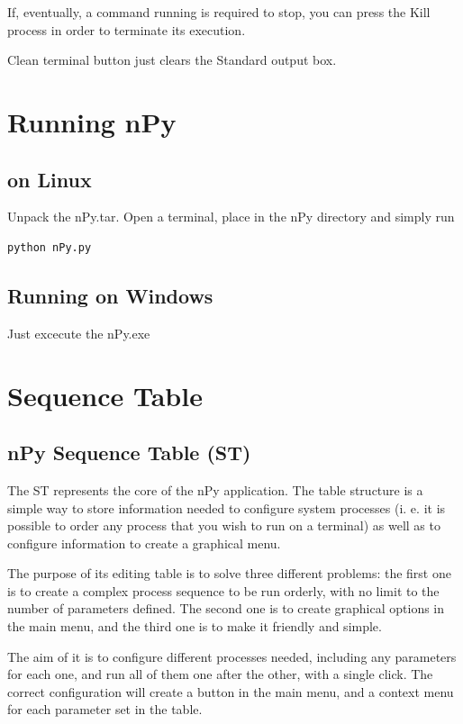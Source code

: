 \documentclass[a4paper,10pt]{article}
\begin{document}
If, eventually, a command running is required to stop, you can press the Kill process in order to terminate its execution.

Clean terminal button just clears the Standard output box.

\section{Running nPy}

\subsection{on Linux}

Unpack the nPy.tar. Open a terminal, place in the nPy directory and simply run
\begin{verbatim}
python nPy.py 
\end{verbatim}

\subsection{Running on Windows}

Just excecute the nPy.exe

\section{Sequence Table}

\subsection{nPy Sequence Table (ST)}

The ST represents the core of the nPy application. The table structure is a simple way to store information needed to configure system processes (i. e.  it is possible to order any process that you wish to run on a terminal) as well as to configure information to create a graphical menu.

The purpose of its editing table is to solve three different problems: the first one is to create a complex process sequence to be run orderly, with no limit to the number of parameters defined. The second one is to create graphical options in the main menu, and the third one is to make it friendly and simple.

The aim of it is to configure different processes needed, including any parameters for each one, and run all of them one after the other, with a single click. The correct configuration will create a button in the main menu, and a context menu for each parameter set in the table.
\end{document}
